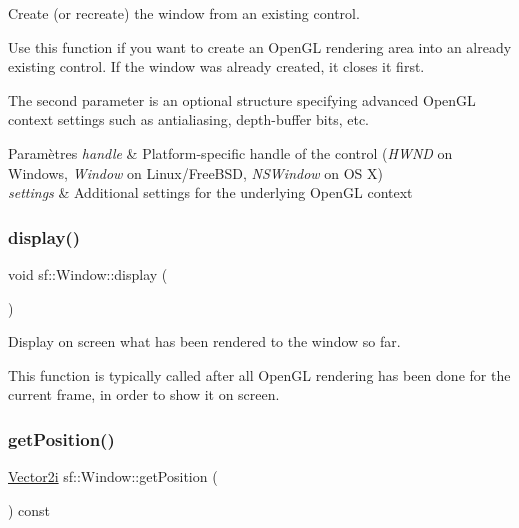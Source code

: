 Create (or recreate) the window from an existing control. 

Use this function if you want to create an Open\+GL rendering area into an already existing control. If the window was already created, it closes it first.

The second parameter is an optional structure specifying advanced Open\+GL context settings such as antialiasing, depth-\/buffer bits, etc.


\begin{DoxyParams}{Paramètres}
{\em handle} & Platform-\/specific handle of the control ({\itshape H\+W\+ND} on Windows, {\itshape Window} on Linux/\+Free\+B\+SD, {\itshape N\+S\+Window} on OS X) \\
\hline
{\em settings} & Additional settings for the underlying Open\+GL context \\
\hline
\end{DoxyParams}
\mbox{\label{classsf_1_1Window_adabf839cb103ac96cfc82f781638772a}} 
\subsubsection{\texorpdfstring{display()}{display()}}
{\footnotesize\ttfamily void sf\+::\+Window\+::display (\begin{DoxyParamCaption}{ }\end{DoxyParamCaption})}



Display on screen what has been rendered to the window so far. 

This function is typically called after all Open\+GL rendering has been done for the current frame, in order to show it on screen. \mbox{\label{classsf_1_1Window_a420028b8e4d9baedcaaba7b2047b8cb3}} 
\subsubsection{\texorpdfstring{get\+Position()}{getPosition()}}
{\footnotesize\ttfamily \hyperlink{classsf_1_1Vector2}{Vector2i} sf\+::\+Window\+::get\+Position (\begin{DoxyParamCaption}{ }\end{DoxyParamCaption}) const}



